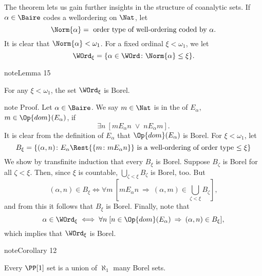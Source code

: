 \documentclass[letterpaper,10pt,english]{jupyterBook}
\begin{document}
\sphinxAtStartPar
The theorem lets us gain further insights in the structure of co\sphinxhyphen{}analytic sets. If \(\alpha \in \Baire\) codes a well\sphinxhyphen{}ordering on \(\Nat\), let
\begin{equation*}
	\Norm{\alpha} = \text{ order type of well-ordering coded by $\alpha$}.
\end{equation*}
\sphinxAtStartPar
It is clear that \(\Norm{\alpha} < \omega_1\). For a fixed ordinal \(\xi < \omega_1\), we let
\begin{equation*}
	\WOrd_\xi = \{ \alpha \in \WOrd \colon \Norm{\alpha} \leq \xi \}.
\end{equation*}\label{coanalytic:lem-bounded-rank-Borel}
\begin{sphinxadmonition}{note}{Lemma 15}



\sphinxAtStartPar
For any \(\xi < \omega_1\), the set \(\WOrd_\xi\) is Borel.
\end{sphinxadmonition}

\begin{sphinxadmonition}{note}
\sphinxAtStartPar
Proof. Let \(\alpha \in \Baire\). We say \(m \in \Nat\) is in the  of \(E_\alpha\), \(m \in \Op{dom}(E_\alpha)\), if
\begin{equation*}
	\exists n \: [ m E_\alpha n \; \vee \; n E_\alpha m].
\end{equation*}
\sphinxAtStartPar
It is clear from the definition of \(E_\alpha\) that \(\Op{dom}(E_\alpha)\) is Borel. For \(\xi < \omega_1\), let
\begin{equation*}
	B_\xi = \{ (\alpha,n) \colon E_\alpha \Rest{\{m \colon m E_\alpha n\}} \text{ is a well-ordering of order type $\leq \xi$} \}
\end{equation*}
\sphinxAtStartPar
We show by transfinite induction that every \(B_\xi\) is Borel. Suppose \(B_\zeta\) is Borel for all \(\zeta < \xi\). Then, since \(\xi\) is countable, \(\bigcup_{\zeta < \xi} B_\zeta\) is Borel, too. But
\begin{equation*}
	(\alpha,n) \in B_\xi \iff \forall m \: [m E_\alpha n \: \Rightarrow \: (\alpha,m) \in \bigcup_{\zeta < \xi} B_\zeta],
\end{equation*}
\sphinxAtStartPar
and from this it follows that \(B_\xi\) is Borel. Finally, note that
\begin{equation*}
	\alpha \in \WOrd_\xi \iff \forall n \; [n \in \Op{dom}(E_\alpha) \: \Rightarrow \: (\alpha,n) \in B_\xi],
\end{equation*}
\sphinxAtStartPar
which implies that \(\WOrd_\xi\) is Borel.
\end{sphinxadmonition}
\label{coanalytic:cor-coanal-union-Borel}
\begin{sphinxadmonition}{note}{Corollary 12}



\sphinxAtStartPar
Every \(\PP[1]\) set is a union of \(\aleph_1\) many Borel sets.
\end{sphinxadmonition}
\end{document}
